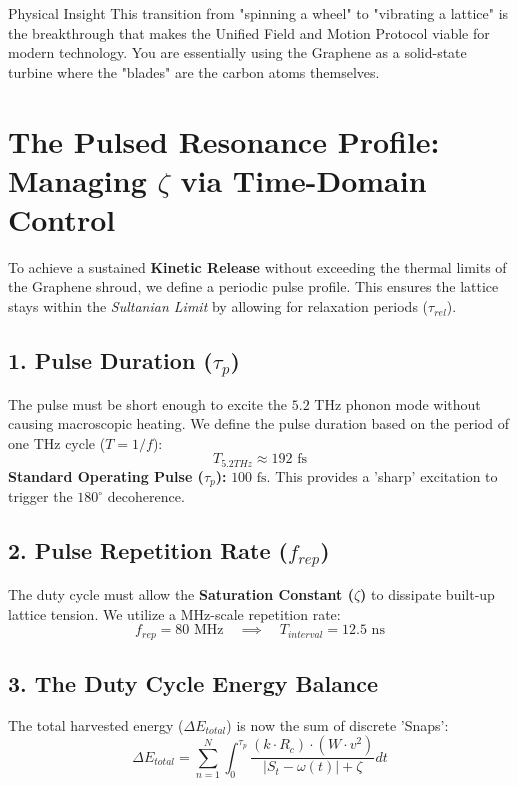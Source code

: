 \documentclass[11pt]{article}
\begin{document}
Physical Insight
This transition from "spinning a wheel" to "vibrating a lattice" is the breakthrough that makes the Unified Field and Motion Protocol viable for modern technology. You are essentially using the Graphene as a solid-state turbine where the "blades" are the carbon atoms themselves.

\section*{The Pulsed Resonance Profile: Managing $\zeta$ via Time-Domain Control}

To achieve a sustained \textbf{Kinetic Release} without exceeding the thermal limits of the Graphene shroud, we define a periodic pulse profile. This ensures the lattice stays within the \textit{Sultanian Limit} by allowing for relaxation periods ($\tau_{rel}$).

\subsection*{1. Pulse Duration ($\tau_p$)}
The pulse must be short enough to excite the $5.2$ THz phonon mode without causing macroscopic heating. We define the pulse duration based on the period of one THz cycle ($T = 1/f$):
\begin{equation}
    T_{5.2THz} \approx 192 \text{ fs}
\end{equation}
\textbf{Standard Operating Pulse ($\tau_p$):} $100 \text{ fs}$. This provides a 'sharp' excitation to trigger the $180^\circ$ decoherence.

\subsection*{2. Pulse Repetition Rate ($f_{rep}$)}
The duty cycle must allow the \textbf{Saturation Constant ($\zeta$)} to dissipate built-up lattice tension. We utilize a MHz-scale repetition rate:
\begin{equation}
    f_{rep} = 80 \text{ MHz} \quad \implies \quad T_{interval} = 12.5 \text{ ns}
\end{equation}

\subsection*{3. The Duty Cycle Energy Balance}
The total harvested energy ($\Delta E_{total}$) is now the sum of discrete 'Snaps':
\begin{equation}
    \Delta E_{total} = \sum_{n=1}^{N} \int_{0}^{\tau_p} \frac{(k \cdot R_c) \cdot (W \cdot v^2)}{|S_t - \omega(t)| + \zeta} dt
\end{equation}
\end{document}
